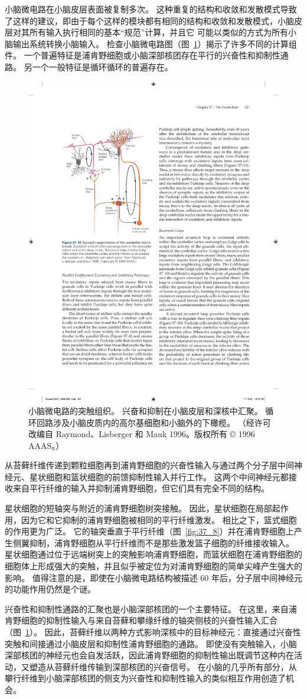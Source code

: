 小脑微电路在小脑皮层表面被复制多次。
这种重复的结构和收敛和发散模式导致了这样的建议，即由于每个这样的模块都有相同的结构和收敛和发散模式，小脑皮层对其所有输入执行相同的基本“规范”计算，并且它 可能以类似的方式为所有小脑输出系统转换小脑输入。
检查小脑微电路图（图~\ref{fig:37_10}）揭示了许多不同的计算组件。
一个普遍特征是浦肯野细胞或小脑深部核团存在平行的兴奋性和抑制性通路。 另一个一般特征是循环循环的普遍存在。


\begin{figure}[htbp]
	\centering
	\includegraphics[width=0.5\linewidth]{chap37/fig_37_10}
	\caption{小脑微电路的突触组织。 兴奋和抑制在小脑皮层和深核中汇聚。 循环回路涉及小脑皮质内的高尔基细胞和小脑外的下橄榄。 （经许可改编自 Raymond、Lisberger 和 Mauk 1996。版权所有 © 1996 AAAS。）}
	\label{fig:37_10}
\end{figure}


从苔藓纤维传递到颗粒细胞再到浦肯野细胞的兴奋性输入与通过两个分子层中间神经元、星状细胞和篮状细胞的前馈抑制性输入并行工作。
这两个中间神经元都接收来自平行纤维的输入并抑制浦肯野细胞，但它们具有完全不同的结构。


星状细胞的短轴突与附近的浦肯野细胞树突接触。
因此，星状细胞在局部起作用，因为它和它抑制的浦肯野细胞被相同的平行纤维激发。
相比之下，篮式细胞的作用更为广泛。 它的轴突垂直于平行纤维（图~\ref{fig:37_8}）并在浦肯野细胞上产生侧翼抑制，浦肯野细胞从平行纤维而不是那些激发篮子细胞的纤维接收输入。
星状细胞通过位于远端树突上的突触影响浦肯野细胞，而篮状细胞在浦肯野细胞的细胞体上形成强大的突触，并且似乎被定位为对浦肯野细胞的简单尖峰产生强大的影响。
值得注意的是，即使在小脑微电路结构被描述 60 年后，分子层中间神经元的功能作用仍然是个谜。


兴奋性和抑制性通路的汇聚也是小脑深部核团的一个主要特征。
在这里，来自浦肯野细胞的抑制性输入与来自苔藓和攀缘纤维的轴突侧枝的兴奋性输入汇合（图~\ref{fig:37_10}）。
因此，苔藓纤维以两种方式影响深核中的目标神经元：直接通过兴奋性突触和间接通过小脑皮层和抑制性浦肯野细胞的通路。
即使没有突触输入，小脑深部核团的神经元也会自发活跃，因此浦肯野细胞的抑制性输出既调节这种内在活动，又塑造从苔藓纤维传输到深部核团的兴奋信号。
在小脑的几乎所有部分，从攀行纤维到小脑深部核团的侧支为兴奋性和抑制性输入的类似相互作用创造了机会。



